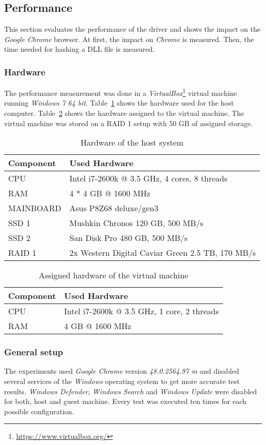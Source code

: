\subsection{Performance}
\label{sec:performance}
This section evaluates the performance of the driver and shows the impact on the \emph{Google Chrome} browser. At first, the impact on \emph{Chrome} is measured. Then, the time needed for hashing a \gls{DLL} file is measured.

\subsubsection{Hardware}
The performance measurement was done in a \emph{VirtualBox}\footnote{\url{https://www.virtualbox.org/}} virtual machine running \emph{Windows 7 64 bit}. Table~\ref{fig:hardware_host} shows the hardware used for the host computer. Table~\ref{fig:hardware_vm} shows the hardware assigned to the virtual machine. The virtual machine was stored on a RAID 1 setup with 50 GB of assigned storage. 
\begin{table}
\centering
\caption{Hardware of the host system}
\label{fig:hardware_host}
\begin{tabularx}{\textwidth}{|l|X|}
\hline
Component & Used Hardware \\ \hline
CPU & Intel i7-2600k @ 3.5 GHz, 4 cores, 8 threads \\ \hline
RAM & 4 * 4 GB @ 1600 MHz \\ \hline
MAINBOARD & Asus P8Z68 deluxe/gen3 \\ \hline
SSD 1 & Mushkin Chronos 120 GB, 500 MB/s \\ \hline
SSD 2 & San Disk Pro 480 GB, 500 MB/s \\ \hline
RAID 1 & 2x Western Digital Caviar Green 2.5 TB, 170 MB/s \\ \hline
\end{tabularx}
\end{table}
\begin{table}
\centering
\caption{Assigned hardware of the virtual machine}
\label{fig:hardware_vm}
\begin{tabularx}{\textwidth}{|l|X|}
\hline
Component & Used Hardware \\ \hline
CPU & Intel i7-2600k @ 3.5 GHz, 1 core, 2 threads \\ \hline
RAM & 4 GB @ 1600 MHz \\ \hline
\end{tabularx}
\end{table}

\subsubsection{General setup}
The experiments used \emph{Google Chrome} version \emph{48.0.2564.97 m} and disabled several services of the \emph{Windows} operating system to get more accurate test results. \emph{Windows Defender}, \emph{Windows Search} and \emph{Windows Update} were disabled for both, host and guest machine. Every test was executed ten times for each possible configuration.


\clearpage
